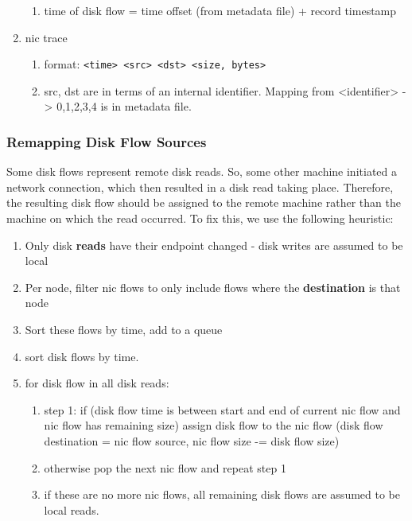 \begin{enumerate}
\begin{enumerate}
    \item time of disk flow = time offset (from metadata file) + record timestamp
    \end{enumerate}
\item nic trace
    \begin{enumerate}
    \item format: \texttt{<time> <src> <dst> <size, bytes>}
    \item src, dst are in terms of an internal identifier. Mapping from <identifier> -> {0,1,2,3,4} is in metadata file.
    \end{enumerate}
\end{enumerate}

\subsubsection{Remapping Disk Flow Sources}
Some disk flows represent remote disk reads. So, some other machine initiated a network connection, which then resulted in a disk read taking place. Therefore, the resulting disk flow should be assigned to the remote machine rather than the machine on which the read occurred.
To fix this, we use the following heuristic:
\begin{enumerate}
\item Only disk \textbf{reads} have their endpoint changed - disk writes are assumed to be local
\item Per node, filter nic flows to only include flows where the \textbf{destination} is that node
\item Sort these flows by time, add to a queue
\item sort disk flows by time.
\item for disk flow in all disk reads:
    \begin{enumerate}
    \item step 1: if (disk flow time is between start and end of current nic flow and nic flow has remaining size) assign disk flow to the nic flow (disk flow destination = nic flow source, nic flow size -= disk flow size)
    \item otherwise pop the next nic flow and repeat step 1
    \item if these are no more nic flows, all remaining disk flows are assumed to be local reads.
    \end{enumerate}
\end{enumerate}

